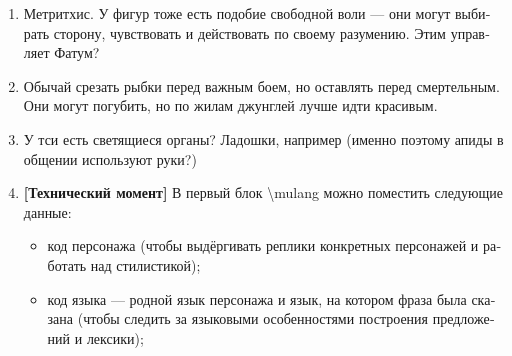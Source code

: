 \documentclass[a4paper,12pt,fleqn]{book}\usepackage{cooltooltips}\usepackage{polyglossia}\setdefaultlanguage[babelshorthands=true]{russian}\setotherlanguage{english}\defaultfontfeatures{Ligatures=TeX,Mapping=tex-text} \usepackage{xcolor}\definecolor{lightgray}{HTML}{bbbbbb}\color{lightgray}\newcommand{\ml}[3]{\textenglish{\textcolor{black}{#3}}}
\begin{document}
{\begin{enumerate}
Хри-соблазнитель.
Покровитель влюблённых, секса, игр и наркоманов.
Атрибут --- пухлые чувственные губы.

Кхар-защитник.
Покровитель защитников, отвечает за стены, ворота и доспехи.
Атрибут --- щит со стрелами.
Кхар-защитник обычно изображается настороженным, но не гневным.
Гневное изображение Кхара-защитника часто встречается в Пыльном Предгорье, иногда Кхар даже рисуется с полностью открытыми глазами (<<Яростный Кхар>>), но такие изображения считаются неканоничными.

Удивлённый Лю.
Отвечает за библиотеки и смотровые башни.
Покровитель учёных, исследователей и разведчиков.
Атрибут --- свиток.
Лю существует в двух вариантах: Удивлённый и Испуганный.
Удивлённый Лю рисуется на дверях библиотек, на тотемах и духовых ружьях.
Испуганный Лю используется в двух ситуациях --- предупреждение об опасности либо мольба об удачном побеге от врага.
Оба варианта признаются каноничными.

Печальный Митр, Митр-певец.
Покровитель отчаявшихся, менестрелей, поэтов и душевнобольных.
Атрибут --- перья для письма и чернильница.

Сан-сновидец.
Отвечает за сон, смерть и душевный покой.
Покровитель врачей и спящих.
Атрибут --- закрытый рот.

Обнимающий Сит.
Прообраз --- Ситхэ ар'Со, некрасивая, слабая и бесплодная женщина, которая ночами во время войн утешала чужих детей.
Покровитель детей, стариков и одиноких людей.
Атрибут --- руки.

\item Метритхис.
У фигур тоже есть подобие свободной воли --- они могут выбирать сторону, чувствовать и действовать по своему разумению.
Этим управляет Фатум?

\item Обычай срезать рыбки перед важным боем, но оставлять перед смертельным.
Они могут погубить, но по жилам джунглей лучше идти красивым.

\item У тси есть светящиеся органы?
Ладошки, например (именно поэтому апиды в общении используют руки?)

\item \textbf{[Технический момент]} В первый блок \textbackslash mulang можно поместить следующие данные:

\begin{itemize}
\item код персонажа (чтобы выдёргивать реплики конкретных персонажей и работать над стилистикой);
\item код языка --- родной язык персонажа и язык, на котором фраза была сказана (чтобы следить за языковыми особенностями построения предложений и лексики);
\end{itemize}


\end{enumerate}}
\end{document}
